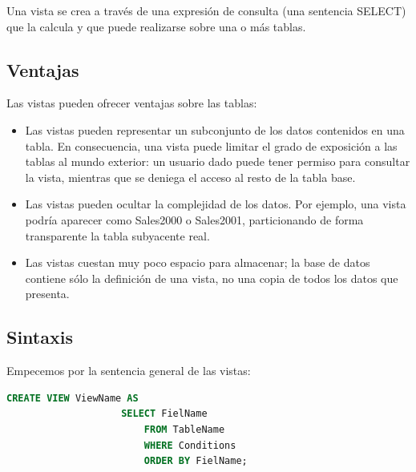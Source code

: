 \documentclass[12pt, fleqn]{report}                             %
\begin{document}
        Una vista se crea a través de una expresión de consulta (una sentencia SELECT) que la calcula y que puede
        realizarse sobre una o más tablas.


        \subsection{Ventajas}

            Las vistas pueden ofrecer ventajas sobre las tablas:

            \begin{itemize}

                \item
                    Las vistas pueden representar un subconjunto de los datos contenidos en una tabla.
                    En consecuencia, una vista puede limitar el grado de exposición a las tablas al mundo exterior:
                    un usuario dado puede tener permiso para consultar la vista, mientras que se deniega el acceso
                    al resto de la tabla base.

                \item
                    Las vistas pueden ocultar la complejidad de los datos.
                    Por ejemplo, una vista podría aparecer como Sales2000 o Sales2001, particionando
                    de forma transparente la tabla subyacente real.

                \item 
                    Las vistas cuestan muy poco espacio para almacenar; la base de datos contiene sólo
                    la definición de una vista, no una copia de todos los datos que presenta.

            \end{itemize}



        \subsection{Sintaxis}

            Empecemos por la sentencia general de las vistas:

            \begin{lstlisting}[language=SQL, gobble=16]
                CREATE VIEW ViewName AS
                    SELECT FielName
                        FROM TableName
                        WHERE Conditions
                        ORDER BY FielName; 
            \end{lstlisting}
\end{document}
